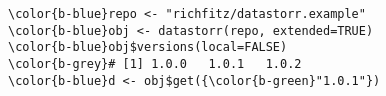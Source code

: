 \documentclass[class=minimal,border=0]{standalone}
\begin{document}
%
\begin{BVerbatim}[bgcolor=b-darkgrey]
\color{b-blue}repo <- "richfitz/datastorr.example"
\color{b-blue}obj <- datastorr(repo, extended=TRUE)
\color{b-blue}obj$versions(local=FALSE)
\color{b-grey}# [1] 1.0.0   1.0.1   1.0.2
\color{b-blue}d <- obj$get({\color{b-green}"1.0.1"})
\end{BVerbatim}
\end{document}
